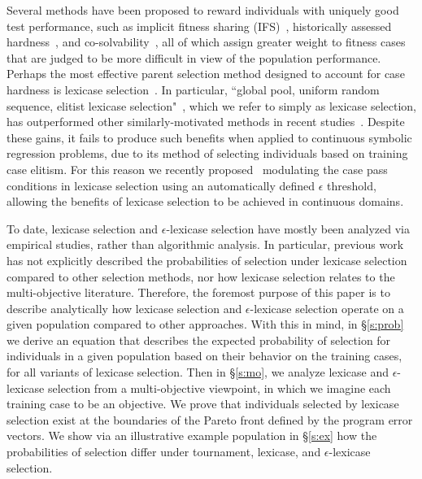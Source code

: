 \documentclass[twoside]{article}
\begin{document}
Several methods have been proposed to reward individuals with uniquely good test performance, such as implicit fitness sharing (IFS)~\citep{mckay_investigation_2001}, historically assessed hardness~\citep{klein_genetic_2008}, and co-solvability~\citep{schaefer_using_2010}, all of which assign greater weight to fitness cases that are judged to be more difficult in view of the population performance. Perhaps the most effective parent selection method designed to account for case hardness is lexicase selection~\citep{spector_assessment_2012}. In particular, ``global  pool,  uniform  random  sequence,  elitist  lexicase  selection"~\citep{spector_assessment_2012}, which we refer to simply as lexicase selection, has outperformed other similarly-motivated methods in recent studies~\citep{helmuth_solving_2014,helmuth_general_2015-1,liskowski_comparison_2015}. Despite these gains, it fails to produce such benefits when applied to continuous symbolic regression problems, due to its method of selecting individuals based on training case elitism. For this reason we recently proposed~\citep{la_cava_epsilon-lexicase_2016} modulating the case pass conditions in lexicase selection using an automatically defined $\epsilon$ threshold, allowing the benefits of lexicase selection to be achieved in continuous domains. 

To date, lexicase selection and $\epsilon$-lexicase selection have mostly been analyzed via empirical studies, rather than algorithmic analysis. In particular, previous work has not explicitly described the probabilities of selection under lexicase selection compared to other selection methods, nor how lexicase selection relates to the multi-objective literature. Therefore, the foremost purpose of this paper is to describe analytically how lexicase selection and $\epsilon$-lexicase selection operate on a given population compared to other approaches. With this in mind, in \S\ref{s:prob} we derive an equation that describes the expected probability of selection for individuals in a given population based on their behavior on the training cases, for all variants of lexicase selection. Then in \S\ref{s:mo}, we analyze lexicase and $\epsilon$-lexicase selection from a multi-objective viewpoint, in which we imagine each training case to be an objective. We prove that individuals selected by lexicase selection exist at the boundaries of the Pareto front defined by the program error vectors. We show via an illustrative example population in \S\ref{s:ex} how the probabilities of selection differ under tournament, lexicase, and $\epsilon$-lexicase selection. 
\end{document}
